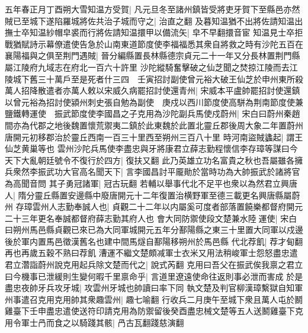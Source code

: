 五年春正月丁酉朔大雪知温方受賀|{
	凡元旦冬至諸州鎮皆受將吏牙賀下至縣邑亦然}
賊已至城下遂陷羅城將佐共治子城而守之|{
	治直之翻}
及暮知温猶不出將佐請知温出撫士卒知温紗帽皁裘而行將佐請知温擐甲以備流矢|{
	皁不早翻擐音宦}
知温見士卒拒戰猶賦詩示幕僚遣使告急於山南東道節度使李福福悉其衆自將救之時有沙陀五百在襄陽福與之俱至荆門遇賊|{
	晉分編縣置長林縣德宗貞元二十一年又分長林置荆門縣屬江陵府九域志在府北一百六十許里}
沙陀縱騎奮擊破之仙芝聞之焚掠江陵而去江陵城下舊三十萬戶至是死者什三四　壬寅招討副使曾元裕大破王仙芝於申州東所殺萬人招降散遣者亦萬人敕以宋威久病罷招討使還青州|{
	宋威本平盧帥罷招討使還鎮}
以曾元裕為招討使潁州刺史張自勉為副使　庚戍以西川節度使高駢為荆南節度使兼鹽鐵轉運使　振武節度使李國昌之子克用為沙陀副兵馬使戍蔚州|{
	宋白曰蔚州秦趙間亦為代郡之地後魏置懷荒禦夷二鎮於此東魏於此置北靈丘郡後周大象二年置蔚州唐開元初移郡治於靈丘西南一百三十里西至朔州三百八十里}
時河南盜賊蠭起|{
	謂王仙芝黄巢等也}
雲州沙陀兵馬使李盡忠與牙將康君立薛志勤程懷信李存璋等謀曰今天下大亂朝廷號令不復行於四方|{
	復扶又翻}
此乃英雄立功名富貴之秋也吾屬雖各擁兵衆然李振武功大官高名聞天下|{
	言李國昌討平龎勛於當時功為大帥振武於諸將官為高聞音問}
其子勇冠諸軍|{
	冠古玩翻}
若輔以舉事代北不足平也衆以為然君立興唐人|{
	隋分靈丘縣置安邊縣中廢唐開元十二年復置治横野軍至德三載更名興唐縣屬蔚州}
存璋雲州人志勤奉誠人也|{
	貞觀二十二年以内屬奚可度者部落置饒樂都督府開元二十三年更名奉誠都督府薛志勤其府人也}
會大同防禦使段文楚兼水陸運使|{
	宋白曰朔州馬邑縣貞觀已來已為大同軍城開元五年分鄯陽縣之東三十里置大同軍以戍邊後於軍内置馬邑徵漢舊名也建中間馬燧自鄯陽移朔州於馬邑縣}
代北荐飢|{
	荐才甸翻再也再歲五穀不熟曰荐飢}
漕運不繼文楚頗减軍士衣米又用法稍峻軍士怨怒盡忠遣君立濳詣蔚州說克用起兵除文楚而代之|{
	說式芮翻}
克用曰吾父在振武俟我禀之君立曰今機事已泄緩則生變何暇千里禀命乎|{
	言道里遼遠使命往返則事必泄而害成}
於是盡忠夜帥牙兵攻牙城|{
	攻雲州牙城也帥讀曰率下同}
執文楚及判官柳漢璋繫獄自知軍州事遣召克用克用帥其衆趣雲州|{
	趣七喻翻}
行收兵二月庚午至城下衆且萬人屯於鬭雞臺下壬申盡忠遣使送符印請克用為防禦留後癸酉盡忠械文楚等五人送鬭雞臺下克用令軍士冎而食之以騎踐其骸|{
	冎古瓦翻踐慈演翻}
